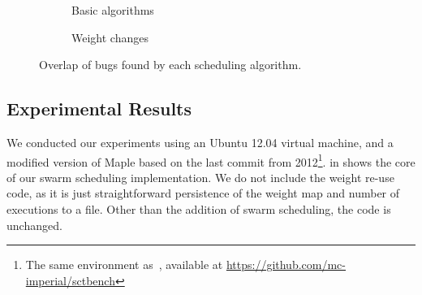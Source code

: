 \begin{figure}
  \centering
  \begin{subfigure}{0.3\textwidth}
    \centering
    \caption{Basic algorithms}\label{fig:bugs-base}
  \end{subfigure}
  \begin{subfigure}{0.3\textwidth}
    \centering
    \caption{Weight changes}\label{fig:bugs-swarmd}
  \end{subfigure}

  \caption{Overlap of bugs found by each scheduling algorithm.}\label{fig:bugs}
\end{figure}

\subsection{Experimental Results}
\label{sec:algorithms-bench-results}

We conducted our experiments using an Ubuntu 12.04 virtual machine,
and a modified version of Maple based on the last commit from
2012\footnote{The same environment as~\cite{thomson2016}, available at
  \url{https://github.com/mc-imperial/sctbench}}.   in
 shows the core of our swarm scheduling
implementation.  We do not include the weight re-use code, as it is
just straightforward persistence of the weight map and number of
executions to a file.  Other than the addition of swarm scheduling,
the code is unchanged.

